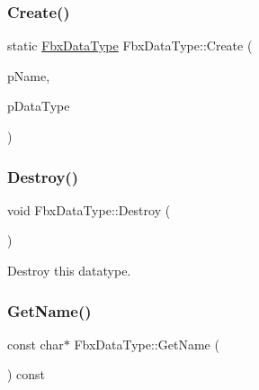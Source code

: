 \mbox{\label{class_fbx_data_type_a9acf98349b03a460f44e80993ebb2473}} 
\subsubsection{\texorpdfstring{Create()}{Create()}\hspace{0.1cm}{\footnotesize\ttfamily [2/2]}}
{\footnotesize\ttfamily static \hyperlink{class_fbx_data_type}{Fbx\+Data\+Type} Fbx\+Data\+Type\+::\+Create (\begin{DoxyParamCaption}\item[{const char $\ast$}]{p\+Name,  }\item[{const \hyperlink{class_fbx_data_type}{Fbx\+Data\+Type} \&}]{p\+Data\+Type }\end{DoxyParamCaption})\hspace{0.3cm}{\ttfamily [static]}}

\mbox{\label{class_fbx_data_type_a7c12ecf6b63f53fb6d9178ccd622eddd}} 
\subsubsection{\texorpdfstring{Destroy()}{Destroy()}}
{\footnotesize\ttfamily void Fbx\+Data\+Type\+::\+Destroy (\begin{DoxyParamCaption}{ }\end{DoxyParamCaption})}



Destroy this datatype. 

\mbox{\label{class_fbx_data_type_a0970d064518d5521574139dc27465f20}} 
\subsubsection{\texorpdfstring{Get\+Name()}{GetName()}}
{\footnotesize\ttfamily const char$\ast$ Fbx\+Data\+Type\+::\+Get\+Name (\begin{DoxyParamCaption}{ }\end{DoxyParamCaption}) const}

